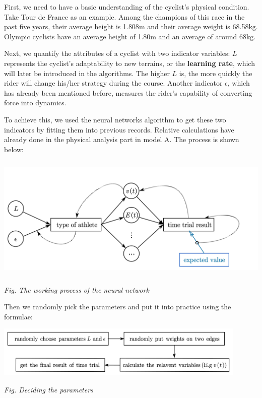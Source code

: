 \documentclass{article}
\begin{document}
			First, we need to have a basic understanding of the cyclist's physical condition. Take Tour de France as an example\cite{france}. Among the champions of this race in the past five years, their average height is 1.808$\mathrm{m}$ and their average weight is 68.58$\mathrm{kg}$. Olympic cyclists have an average height of 1.80$\mathrm{m}$ and an average of around 68$\mathrm{kg}$\cite{weight}.

			Next, we quantify the attributes of a cyclist with two indicator variables: \(L\) represents the cyclist's adaptability to new terrains, or the \textbf{learning rate}, which will later be introduced in the algorithms. The higher \(L\) is, the more quickly the rider will change his/her strategy during the course. Another indicator \(\epsilon\), which has already been mentioned before, measures the rider's capability of converting force into dynamics.

			To achieve this, we used the neural networks algorithm to get these two indicators by fitting them into previous records. Relative calculations have already done in the physical analysis part in model A. The process is shown below:

			\begin{center}
				\includegraphics[height = 6cm]{neural networks.png}

				\small\textit{Fig. The working process of the neural network}
			\end{center}

			Then we randomly pick the parameters and put it into practice using the formulae:

			\begin{center}
				\includegraphics[width=12cm]{deciding the parameters.png}

				\small\textit{Fig. Deciding the parameters}
			\end{center}
\end{document}
